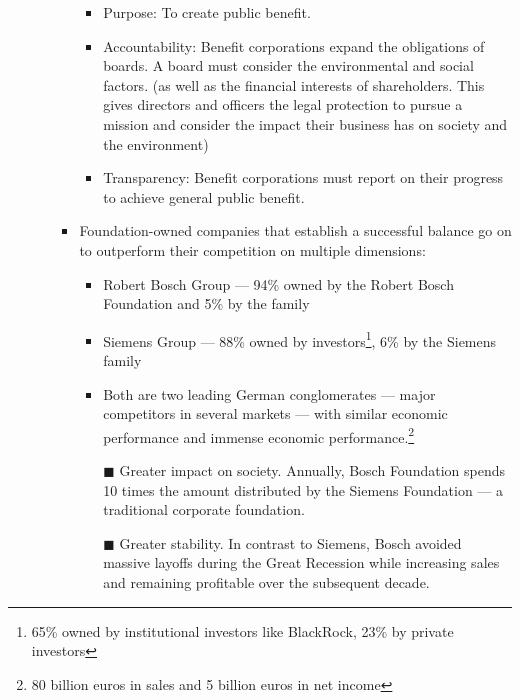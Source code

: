 \documentclass[oneside]{book}
\begin{document}
\begin{enumerate}
\begin{itemize}
\begin{itemize}
\begin{itemize}
                \item Purpose: To create public benefit. 
                \item Accountability: Benefit corporations expand the obligations of boards. A board must consider the environmental and social factors. (as well as the financial interests of shareholders. This gives directors and officers the legal protection to pursue a mission and consider the impact their business has on society and the environment)
                \item Transparency: Benefit corporations must report on their progress to achieve general public benefit.
            \end{itemize}
            \item Foundation-owned companies that establish a successful balance go on to outperform their competition on multiple dimensions: 
            \begin{itemize}
                \item Robert Bosch Group --- 94\% owned by the Robert Bosch Foundation and 5\% by the family
                \item Siemens Group --- 88\% owned by investors\footnote{65\% owned by institutional investors like BlackRock, 23\% by private investors}, 6\% by the Siemens family 
                \item Both are two leading German conglomerates --- major competitors in several markets --- with similar economic performance and immense economic performance.\footnote{80 billion euros in sales and 5 billion euros in net income}
                \item[\(\blacksquare\)] Greater impact on society. Annually, Bosch Foundation spends 10 times the amount distributed by the Siemens Foundation --- a traditional corporate foundation.
                \item[\(\blacksquare\)] Greater stability. In contrast to Siemens, Bosch avoided massive layoffs during the Great Recession while increasing sales and remaining profitable over the subsequent decade. 
            \end{itemize}
        \end{itemize}
    \end{itemize}
\end{enumerate}
\end{document}
